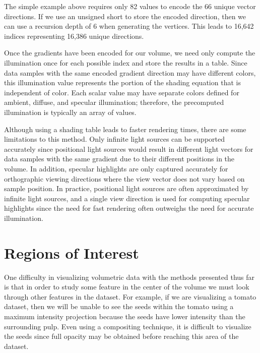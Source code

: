 The simple example above requires only 82 values to encode the 66 unique vector directions. If we use an unsigned short to store the encoded direction, then we can use a recursion depth of 6 when generating the vertices. This leads to 16,642 indices representing 16,386 unique directions.

Once the gradients have been encoded for our volume, we need only compute the illumination once for each possible index and store the results in a table. Since data samples with the same encoded gradient direction may have different colors, this illumination value represents the portion of the shading equation that is independent of color. Each scalar value may have separate colors defined for ambient, diffuse, and specular illumination; therefore, the precomputed illumination is typically an array of values.

Although using a shading table leads to faster rendering times, there are some limitations to this method. Only infinite light sources can be supported accurately since positional light sources would result in different light vectors for data samples with the same gradient due to their different positions in the volume. In addition, specular highlights are only captured accurately for orthographic viewing directions where the view vector does not vary based on sample position. In practice, positional light sources are often approximated by infinite light sources, and a single view direction is used for computing specular highlights since the need for fast rendering often outweighs the need for accurate illumination.

\section{Regions of Interest}

One difficulty in visualizing volumetric data with the methods presented thus far is that in order to study some feature in the center of the volume we must look through other features in the dataset. For example, if we are visualizing a tomato dataset, then we will be unable to see the seeds within the tomato using a maximum intensity projection because the seeds have lower intensity than the surrounding pulp. Even using a compositing technique, it is difficult to visualize the seeds since full opacity may be obtained before reaching this area of the dataset.

